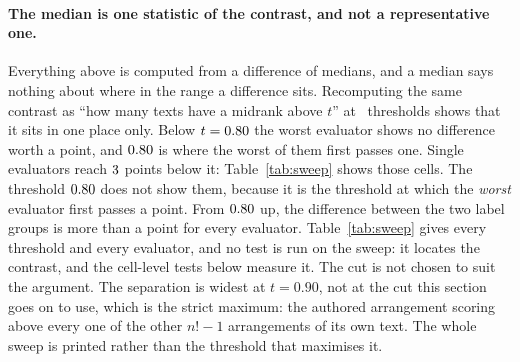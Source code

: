 \begin{table}[tbp]
\centering
{\small}
\caption{Every (evaluator, corpus) cell of the AR ladder.  Columns from the
left: the evaluator; the corpus; the median over that cell's texts of
$\Dblock$, the raw value of Eq.~\eqref{eq:delta} for the authored
arrangement, per token; the rank-biserial correlation $r$ of
Eq.~\eqref{eq:rb} between the two label groups, positive when the causal
group ranks higher; and its two-sided Mann--Whitney $p$.  A star
marks the cells that clear the Bonferroni threshold of
$\ContrastBonferroni$, so the counts this section quotes can be read off
rather than recomputed from a $p$ printed at the threshold.  Those counts,
and the ones in Section~\ref{sec:capacity}, are taken over these rows; the
$\Dblock$ column is the quantity Section~\ref{sec:capacity} reports a range
of, and the denominators of the factor quoted in
Section~\ref{sec:fixedtext}.}
\label{tab:blkcells}
\end{table}

\paragraph{The median is one statistic of the contrast, and not a
representative one.}
Everything above is computed from a difference of medians, and a median
says nothing about where in the range a difference sits.  Recomputing the
same contrast as ``how many texts have a midrank above $t$'' at
\TailSweepNThr\ thresholds shows that it sits in one place only.  Below
$t = 0.80$ the worst evaluator shows no difference worth a point,
and $0.80$ is where the worst of them first passes one.  Single
evaluators reach $3$ points below it: Table~\ref{tab:sweep}
shows those cells.  The threshold $0.80$ does not show them,
because it is the threshold at which the \emph{worst} evaluator first
passes a point.  From
$0.80$ up, the difference between the two label groups is more
than a point for every evaluator.  Table~\ref{tab:sweep} gives every threshold and every evaluator, and
no test is run on the sweep: it locates the contrast, and the cell-level
tests below measure it.  The cut is not chosen to suit the argument.  The separation is
widest at $t = 0.90$, not at the cut this section goes on to use, which is
the strict maximum: the authored arrangement scoring above every one of the
other $n! - 1$ arrangements of its own text.  The whole sweep is printed
rather than the threshold that maximises it.

